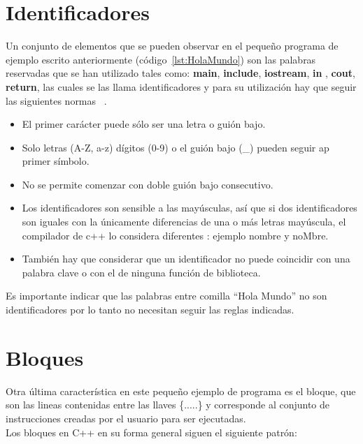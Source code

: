 \documentclass[a4paper,12pt,spanish]{article}
\begin{document}
\section{Identificadores}
\label{sec:identificadores}

Un conjunto de elementos que se pueden observar en el pequeño programa de
ejemplo escrito anteriormente (código~\ref{lst:HolaMundo}) son las palabras reservadas que se han utilizado tales como: \textbf{main}, \textbf{include}, \textbf{iostream}, \textbf{in} , \textbf{cout}, \textbf{return}, las cuales se las llama identificadores y para su  utilización
hay que seguir las siguientes normas~\cite{aguilar2008} .\\

\begin{itemize}
  \item El primer carácter puede sólo ser una letra o guión bajo.
  \item Solo letras (A-Z, a-z) dígitos (0-9) o el guión bajo (\_)
  pueden seguir ap primer símbolo.
  \item No se permite comenzar con doble guión bajo consecutivo.
  \item Los identificadores son sensible a las mayúsculas, así que si
  dos identificadores son iguales con la únicamente diferencias de una
  o más letras mayúscula, el compilador de c++ lo considera diferentes
  : ejemplo nombre y noMbre.
  \item También hay que considerar que un identificador no puede
  coincidir con una palabra clave o con el de ninguna función de biblioteca.
  
\end{itemize}
Es importante indicar que las palabras entre comilla ``Hola Mundo'' no
son identificadores por lo tanto no necesitan seguir las reglas
indicadas.

\section{Bloques}
\label{sec:bloques}

Otra última característica en este pequeño ejemplo de programa es el
bloque, que son las lineas contenidas entre las llaves \{.....\} y
corresponde al conjunto de instrucciones creadas por el usuario para
ser ejecutadas. \\

Los bloques en C++ en su forma general siguen el siguiente patrón:
\end{document}
